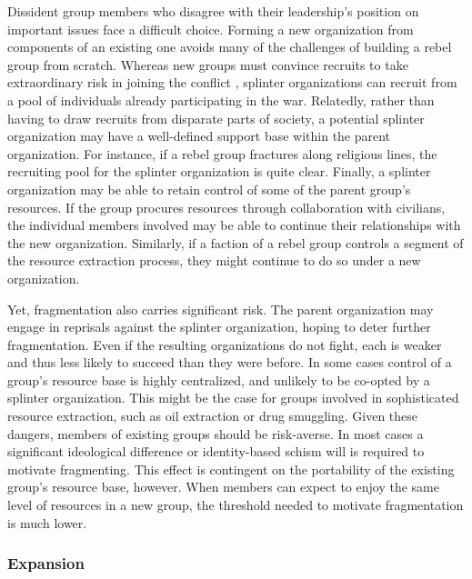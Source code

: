 Dissident group members who disagree with their leadership's position on important issues face a difficult choice. Forming a new organization from components of an existing one avoids many of the challenges of building a rebel group from scratch. Whereas new groups must convince recruits to take extraordinary risk in joining the conflict \citep{Lichbach1995}, splinter organizations can recruit from a pool of individuals already participating in the war. Relatedly, rather than having to draw recruits from disparate parts of society, a potential splinter organization may have a well-defined support base within the parent organization. For instance, if a rebel group fractures along religious lines, the recruiting pool for the splinter organization is quite clear. Finally, a splinter organization may be able to retain control of some of the parent group's resources. If the group procures resources through collaboration with civilians, the individual members involved may be able to continue their relationships with the new organization. Similarly, if a faction of a rebel group controls a segment of the resource extraction process, they might continue to do so under a new organization. 

Yet, fragmentation also carries significant risk. The parent organization may engage in reprisals against the splinter organization, hoping to deter further fragmentation. Even if the resulting organizations do not fight, each is weaker and thus less likely to succeed than they were before. In some cases control of a group's resource base is highly centralized, and unlikely to be co-opted by a splinter organization. This might be the case for groups involved in sophisticated resource extraction, such as oil extraction or drug smuggling. Given these dangers, members of existing groups should be risk-averse. In most cases a significant ideological difference or identity-based schism will is required to motivate fragmenting. This effect is contingent on the portability of the existing group's resource base, however. When members can expect to enjoy the same level of resources in a new group, the threshold needed to motivate fragmentation is much lower.

\subsubsection{Expansion}

